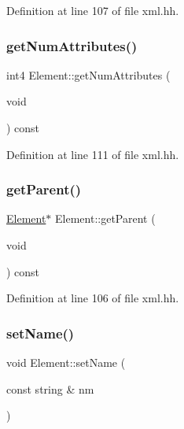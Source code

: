 Definition at line 107 of file xml.\+hh.

\mbox{\label{class_element_a0d3ecdbc2781958e4baa06c9d3c4316c}} 
\subsubsection{\texorpdfstring{getNumAttributes()}{getNumAttributes()}}
{\footnotesize\ttfamily int4 Element\+::get\+Num\+Attributes (\begin{DoxyParamCaption}\item[{void}]{ }\end{DoxyParamCaption}) const\hspace{0.3cm}{\ttfamily [inline]}}



Definition at line 111 of file xml.\+hh.

\mbox{\label{class_element_a6655a8693d105f46eeb0bef0194b002d}} 
\subsubsection{\texorpdfstring{getParent()}{getParent()}}
{\footnotesize\ttfamily \mbox{\hyperlink{class_element}{Element}}$\ast$ Element\+::get\+Parent (\begin{DoxyParamCaption}\item[{void}]{ }\end{DoxyParamCaption}) const\hspace{0.3cm}{\ttfamily [inline]}}



Definition at line 106 of file xml.\+hh.

\mbox{\label{class_element_a341bf668e56bdb5afce663d61f3ca011}} 
\subsubsection{\texorpdfstring{setName()}{setName()}}
{\footnotesize\ttfamily void Element\+::set\+Name (\begin{DoxyParamCaption}\item[{const string \&}]{nm }\end{DoxyParamCaption})\hspace{0.3cm}{\ttfamily [inline]}}



